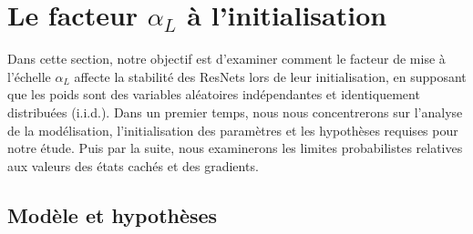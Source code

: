 \chapter{Le facteur $\alpha_L$ à l'initialisation}\label{chap2}
Dans cette section, notre objectif est d'examiner comment le facteur de mise à l'échelle $\alpha_L$ affecte la stabilité des ResNets lors de leur initialisation, en supposant que les poids sont des variables aléatoires indépendantes et identiquement distribuées (i.i.d.). Dans un premier temps, nous nous concentrerons sur l'analyse de la modélisation, l'initialisation des paramètres et les hypothèses requises pour notre étude. Puis par la suite, nous examinerons les limites probabilistes relatives aux valeurs des états cachés et des gradients.

\section{Modèle et hypothèses}
